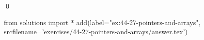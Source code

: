 
\begin{ex}
  \label{ex:44-27-pointers-and-arrays}
  
  \qed
\end{ex}
\begin{python0}
from solutions import *
add(label="ex:44-27-pointers-and-arrays",
    srcfilename='exercises/44-27-pointers-and-arrays/answer.tex')
\end{python0}
